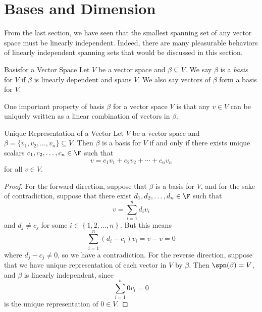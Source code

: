 \documentclass[linearalgebraI]{subfiles}
\begin{document}
    \section{Bases and Dimension}

    \begin{remark}
        From the last section, we have seen that the smallest spanning set of any vector space must be linearly independent. Indeed, there are many pleasurable behaviors of linearly independent spanning sets that would be discussed in this section. 
    \end{remark}

    \begin{definition}{Basis}{for a Vector Space}
        Let $V$ be a vector space and $\beta\subseteq V$. We say $\beta$ is a \emph{basis} for $V$ if $\beta$ is linearly dependent and spans $V$. We also say vectors of $\beta$ form a basis for $V$.
    \end{definition}

    \begin{remark}
        One important property of basis $\beta$ for a vector space $V$ is that any $v\in V$ can be uniquely written as a linear combination of vectors in $\beta$.
    \end{remark}

    \begin{prop}{Unique Representation of a Vector}
        Let $V$ be a vector space and $\beta = \lbrace v_1, v_2, \ldots, v_n \rbrace\subseteq V$. Then $\beta$ is a basis for $V$ if and only if there exists unique scalars $c_1, c_2, \ldots, c_n\in \F$ such that
        \begin{equation*}
            v = c_1v_1 + c_2v_2 + \cdots + c_nv_n
        \end{equation*}
        for all $v\in V$.
    \end{prop}

    \begin{proof}
        For the forward direction, suppose that $\beta$ is a basis for $V$, and for the sake of contradiction, suppose that there exist $d_1,d_2,\ldots,d_n\in\F$ such that
        \begin{equation*}
            v = \sum^{n}_{i=1} d_iv_i
        \end{equation*}
        and $d_j\neq c_j$ for some $i\in\left\lbrace 1,2,\ldots,n \right\rbrace$. But this means 
        \begin{equation*}
            \sum^{n}_{i=1} \left( d_i-c_i \right) v_i = v - v = 0
        \end{equation*}
        where $d_j-c_j\neq 0$, so we have a contradiction. For the reverse direction, suppose that we have unique representation of each vector in $V$ by $\beta$. Then $\spn(\beta)=V$, and $\beta$ is linearly independent, since
        \begin{equation*}
            \sum^{n}_{i=1} 0v_i = 0
        \end{equation*}
        is the unique representation of $0\in V$.
    \end{proof}
\end{document}
